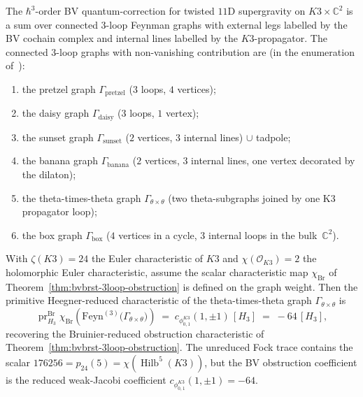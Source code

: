 \begin{theorem}
\label{thm:bvbrst-3loop-feynman}
The $\hbar^3$-order BV quantum-correction for twisted $11$D
supergravity on $K3\times\mathbb{C}^2$ is a sum over connected
$3$-loop Feynman graphs with external legs labelled by the BV
cochain complex and internal lines labelled by the $K3$-propagator.
The connected $3$-loop graphs with non-vanishing contribution are
(in the enumeration of~\cite[\S 10]{CostelloGwilliam2017}):
\begin{enumerate}[leftmargin=1.8em,label=\textup{(\roman*)}]
\item the pretzel graph $\Gamma_{\mathrm{pretzel}}$ ($3$ loops, $4$ vertices);
\item the daisy graph $\Gamma_{\mathrm{daisy}}$ ($3$ loops, $1$ vertex);
\item the sunset graph $\Gamma_{\mathrm{sunset}}$ ($2$ vertices, $3$ internal lines) $\cup$ tadpole;
\item the banana graph $\Gamma_{\mathrm{banana}}$ ($2$ vertices, $3$ internal lines,
 one vertex decorated by the dilaton);
\item the theta-times-theta graph $\Gamma_{\theta\times\theta}$
 (two theta-subgraphs joined by one K3 propagator loop);
\item the box graph $\Gamma_{\mathrm{box}}$ ($4$ vertices in a cycle,
 $3$ internal loops in the bulk~$\mathbb{C}^2$).
\end{enumerate}
With $\zeta(K3) = 24$ the Euler characteristic of $K3$ and
$\chi(\mathcal{O}_{K3}) = 2$ the holomorphic Euler characteristic,
assume the scalar characteristic map \(\chi_{\mathrm{Br}}\) of
Theorem~\ref{thm:bvbrst-3loop-obstruction} is defined on the graph
weight. Then the primitive Heegner-reduced characteristic of the
theta-times-theta graph $\Gamma_{\theta\times\theta}$ is
\begin{equation}\label{eq:bv-3loop-feynman-dominant}
 \operatorname{pr}_{H_3}^{\mathrm{Br}}
 \chi_{\mathrm{Br}}\!\left(
 \mathrm{Feyn}^{(3)}\bigl(\Gamma_{\theta\times\theta}\bigr)
 \right)
 \;=\;
 c_{\phi_{0,1}^{K3}}(1,\pm1)\,[H_3]
 \;=\;
 -64\,[H_3],
\end{equation}
recovering the Bruinier-reduced obstruction characteristic of
Theorem~\ref{thm:bvbrst-3loop-obstruction}. The unreduced Fock trace
contains the scalar $176256=p_{24}(5)=\chi(\operatorname{Hilb}^5(K3))$,
but the BV obstruction coefficient is the reduced weak-Jacobi
coefficient \(c_{\phi_{0,1}^{K3}}(1,\pm1)=-64\).
\end{theorem}

